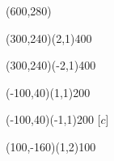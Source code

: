 \documentclass[12pt]{article}
\begin{document}
\begin{figure}[htb]
\hspace*{\fill}
\begin{egame}(600,280)

\renewcommand{\egarrowstyle}{}

%
\putbranch(300,240)(2,1){400}

\renewcommand{\egarrowstyle}{}

\putbranch(300,240)(-2,1){400}

\renewcommand{\egarrowstyle}{}

\putbranch(-100,40)(1,1){200}

\renewcommand{\egarrowstyle}{}

\putbranch(-100,40)(-1,1){200}
[$c$]




\renewcommand{\egarrowstyle}{}

\putbranch(100,-160)(1,2){100}

\renewcommand{\egarrowstyle}{}


\end{egame}
\end{figure}
\end{document}
